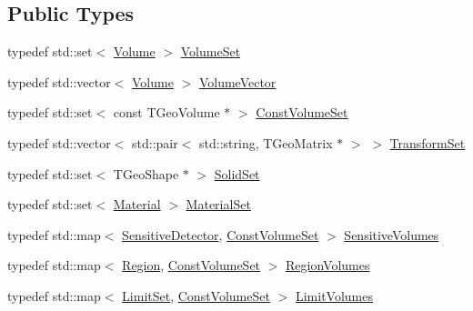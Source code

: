 \subsection*{Public Types}
\begin{DoxyCompactItemize}
\item 
typedef std::set$<$ \hyperlink{class_d_d4hep_1_1_geometry_1_1_volume}{Volume} $>$ \hyperlink{class_d_d4hep_1_1_geometry_1_1_geo_handler_types_a87ea3b22bdfe08f1a4afca3d58fd8ca0}{VolumeSet}
\item 
typedef std::vector$<$ \hyperlink{class_d_d4hep_1_1_geometry_1_1_volume}{Volume} $>$ \hyperlink{class_d_d4hep_1_1_geometry_1_1_geo_handler_types_a6713619ef278692ebdf9f6ee4a3f32de}{VolumeVector}
\item 
typedef std::set$<$ const TGeoVolume $\ast$ $>$ \hyperlink{class_d_d4hep_1_1_geometry_1_1_geo_handler_types_ae294545274767eb8cf886a303033b351}{ConstVolumeSet}
\item 
typedef std::vector$<$ std::pair$<$ std::string, TGeoMatrix $\ast$ $>$ $>$ \hyperlink{class_d_d4hep_1_1_geometry_1_1_geo_handler_types_aa52b3113e87db04c37666e85a9b5e569}{TransformSet}
\item 
typedef std::set$<$ TGeoShape $\ast$ $>$ \hyperlink{class_d_d4hep_1_1_geometry_1_1_geo_handler_types_a85d065cdf670a4f9ea9c0c4dee921fce}{SolidSet}
\item 
typedef std::set$<$ \hyperlink{class_d_d4hep_1_1_geometry_1_1_material}{Material} $>$ \hyperlink{class_d_d4hep_1_1_geometry_1_1_geo_handler_types_a2cb3f04bc3529531d1559173eea5f7b5}{MaterialSet}
\item 
typedef std::map$<$ \hyperlink{class_d_d4hep_1_1_geometry_1_1_sensitive_detector}{SensitiveDetector}, \hyperlink{class_d_d4hep_1_1_geometry_1_1_geo_handler_types_ae294545274767eb8cf886a303033b351}{ConstVolumeSet} $>$ \hyperlink{class_d_d4hep_1_1_geometry_1_1_geo_handler_types_a530cdc551e68a5f975fe294329d27e63}{SensitiveVolumes}
\item 
typedef std::map$<$ \hyperlink{class_d_d4hep_1_1_geometry_1_1_region}{Region}, \hyperlink{class_d_d4hep_1_1_geometry_1_1_geo_handler_types_ae294545274767eb8cf886a303033b351}{ConstVolumeSet} $>$ \hyperlink{class_d_d4hep_1_1_geometry_1_1_geo_handler_types_a8e121c3a06f16781bbabba4528136654}{RegionVolumes}
\item 
typedef std::map$<$ \hyperlink{class_d_d4hep_1_1_geometry_1_1_limit_set}{LimitSet}, \hyperlink{class_d_d4hep_1_1_geometry_1_1_geo_handler_types_ae294545274767eb8cf886a303033b351}{ConstVolumeSet} $>$ \hyperlink{class_d_d4hep_1_1_geometry_1_1_geo_handler_types_ad8397c24589a1508baf0735bdb2b3c77}{LimitVolumes}

\end{DoxyCompactItemize}
